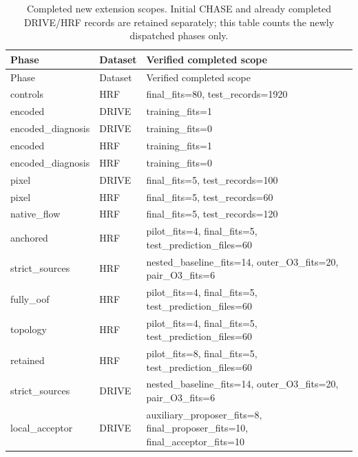 \documentclass[jimaging,article,submit,pdftex,moreauthors]{Definitions/mdpi}
\begin{document}
\begingroup\scriptsize\setlength{\tabcolsep}{3pt}\renewcommand{\arraystretch}{1.04}\setlength{\LTleft}{-\extralength}\setlength{\LTright}{0pt plus1fill}\setlength{\LTcapwidth}{\dimexpr 15.400cm+12pt\relax}\captionsetup[longtable]{margin=0pt,width=\LTcapwidth,singlelinecheck=false,justification=raggedright}\makeatletter\long{}\makeatother
\begin{longtable}{@{}>{\raggedright\arraybackslash}p{3.0cm}>{\raggedright\arraybackslash}p{1.4cm}>{\raggedright\arraybackslash}p{11.0cm}@{}}
\caption{Completed new extension scopes. Initial CHASE and already completed DRIVE/HRF records are retained separately; this table counts the newly dispatched phases only.}\label{tab:execution-registry}\\
\toprule
Phase & Dataset & Verified completed scope\\
\midrule\endfirsthead
\toprule
Phase & Dataset & Verified completed scope\\
\midrule\endhead
\bottomrule\endfoot
controls & HRF & final\_fits=80, test\_records=1920\\
encoded & DRIVE & training\_fits=1\\
encoded\_diagnosis & DRIVE & training\_fits=0\\
encoded & HRF & training\_fits=1\\
encoded\_diagnosis & HRF & training\_fits=0\\
pixel & DRIVE & final\_fits=5, test\_records=100\\
pixel & HRF & final\_fits=5, test\_records=60\\
native\_flow & HRF & final\_fits=5, test\_records=120\\
anchored & HRF & pilot\_fits=4, final\_fits=5, test\_prediction\_files=60\\
strict\_sources & HRF & nested\_baseline\_fits=14, outer\_O3\_fits=20, pair\_O3\_fits=6\\
fully\_oof & HRF & pilot\_fits=4, final\_fits=5, test\_prediction\_files=60\\
topology & HRF & pilot\_fits=4, final\_fits=5, test\_prediction\_files=60\\
retained & HRF & pilot\_fits=8, final\_fits=5, test\_prediction\_files=60\\
strict\_sources & DRIVE & nested\_baseline\_fits=14, outer\_O3\_fits=20, pair\_O3\_fits=6\\
local\_acceptor & DRIVE & auxiliary\_proposer\_fits=8, final\_proposer\_fits=10, final\_acceptor\_fits=10\\

\end{longtable}
\end{document}
